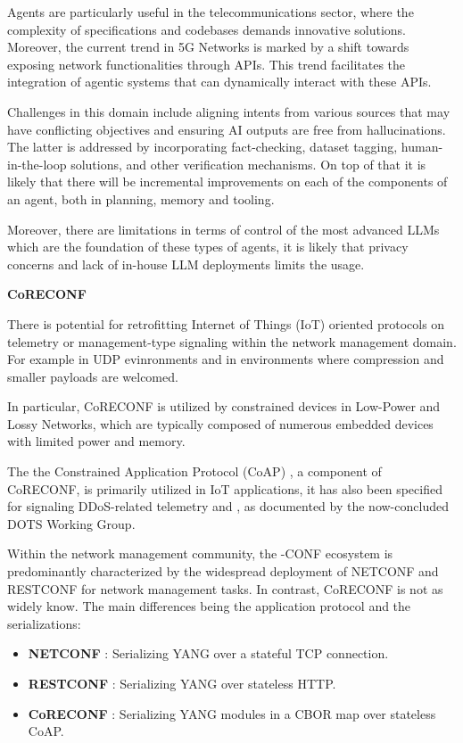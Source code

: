 \documentclass[10pt,sigconf]{iabart}
\begin{document}
Agents are particularly useful in the telecommunications sector, where the complexity of specifications and codebases demands innovative solutions. Moreover, the current trend in 5G Networks is marked by a shift towards exposing network functionalities through APIs. This trend facilitates the integration of agentic systems that can dynamically interact with these APIs.

Challenges in this domain include aligning intents from various sources that may have conflicting objectives and ensuring AI outputs are free from hallucinations. The latter is addressed by incorporating fact-checking, dataset tagging, human-in-the-loop solutions, and other verification mechanisms. On top of that it is likely that there will be incremental improvements on each of the components of an agent, both in planning, memory and tooling.

Moreover, there are limitations in terms of control of the most advanced LLMs which are the foundation of these types of agents, it is likely that privacy concerns and lack of in-house LLM deployments limits the usage.

\textbf{CoRECONF}

There is potential for retrofitting Internet of Things (IoT) oriented protocols on telemetry or management-type signaling within the network management domain. For example in UDP evinronments and in environments where compression and smaller payloads are welcomed. 

In particular, CoRECONF is utilized by constrained devices in Low-Power and Lossy Networks, which are typically composed of numerous embedded devices with limited power and memory. 

The the Constrained Application Protocol (CoAP) \cite{RFC7252}, a component of CoRECONF, is primarily utilized in IoT applications, it has also been specified for signaling DDoS-related telemetry \cite{RFC9132} and \cite{RFC9362}, as documented by the now-concluded DOTS Working Group. 

Within the network management community, the -CONF ecosystem is predominantly characterized by the widespread deployment of NETCONF and RESTCONF for network management tasks. In contrast, CoRECONF is not as widely know. The main differences being the application protocol and the serializations:

\begin{itemize}
  \item \textbf{NETCONF} \cite{RFC6241}: Serializing YANG over a stateful TCP connection.    
  \item \textbf{RESTCONF} \cite{RFC8040}: Serializing YANG over stateless HTTP.
  \item \textbf{CoRECONF} \cite{draft-ietf-core-comi}: Serializing YANG modules in a CBOR \cite{RFC9254} map over stateless CoAP.
\end{itemize}
\end{document}

